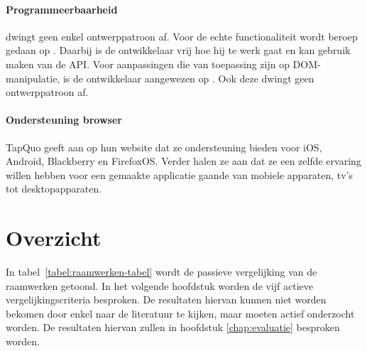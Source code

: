 \paragraph{Programmeerbaarheid}
\label{sec:lungo-programeerbaarheid}
\lungo{} dwingt geen enkel ontwerppatroon af.
Voor de echte functionaliteit wordt beroep gedaan op \js{}.
Daarbij is de ontwikkelaar vrij hoe hij te werk gaat en kan gebruik maken van de \lungo{} API. 
Voor aanpassingen die van toepassing zijn op DOM-manipulatie, is de ontwikkelaar aangewezen op \quo{}.
Ook deze dwingt geen ontwerppatroon af.

\paragraph{Ondersteuning browser}
TapQuo geeft aan op hun website dat ze ondersteuning bieden voor iOS, Android, Blackberry en FirefoxOS.
Verder halen ze aan dat ze een zelfde ervaring willen hebben voor een gemaakte applicatie gaande van mobiele apparaten, tv's tot desktopapparaten.


\section{Overzicht}
\label{sec:raamwerken-tabel}

In tabel~\ref{tabel:raamwerken-tabel} wordt de passieve vergelijking van de raamwerken getoond.
In het volgende hoofdstuk worden de vijf actieve vergelijkingscriteria besproken.
De resultaten hiervan kunnen niet worden bekomen door enkel naar de literatuur te kijken, maar moeten actief onderzocht worden.
De resultaten hiervan zullen in hoofdstuk \ref{chap:evaluatie} besproken worden.

\begin{landscape}
\begin{table}[H]
\centering
{}
\caption{Passieve vergelijking van \st{}, \kendo{}, \jqm{} en \lungo{}}
\label{tabel:raamwerken-tabel}
\end{table}
\end{landscape}

